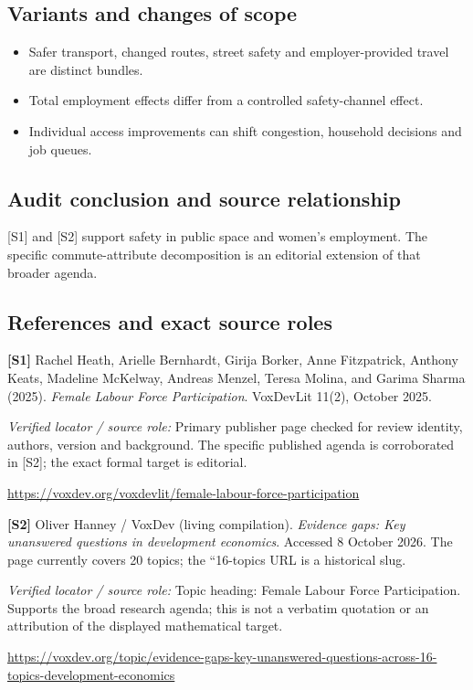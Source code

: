 \documentclass[11pt,a4paper]{article}
\begin{document}
\subsection*{Variants and changes of scope}

\begin{itemize}
\item Safer transport, changed routes, street safety and employer-provided travel are distinct bundles.
\item Total employment effects differ from a controlled safety-channel effect.
\item Individual access improvements can shift congestion, household decisions and job queues.
\end{itemize}

\subsection*{Audit conclusion and source relationship}

[S1] and [S2] support safety in public space and women's employment. The specific commute-attribute decomposition is an editorial extension of that broader agenda.

\subsection*{References and exact source roles}

{\footnotesize\raggedright
\par\noindent\textbf{[S1]} Rachel Heath, Arielle Bernhardt, Girija Borker, Anne Fitzpatrick, Anthony Keats, Madeline McKelway, Andreas Menzel, Teresa Molina, and Garima Sharma (2025). \emph{Female Labour Force Participation}. VoxDevLit 11(2), October 2025.\par \textit{Verified locator / source role:} Primary publisher page checked for review identity, authors, version and background. The specific published agenda is corroborated in [S2]; the exact formal target is editorial.\par \url{https://voxdev.org/voxdevlit/female-labour-force-participation}\par\smallskip
\par\noindent\textbf{[S2]} Oliver Hanney / VoxDev (living compilation). \emph{Evidence gaps: Key unanswered questions in development economics}. Accessed 8 October 2026. The page currently covers 20 topics; the ``16-topics URL is a historical slug.\par \textit{Verified locator / source role:} Topic heading: Female Labour Force Participation. Supports the broad research agenda; this is not a verbatim quotation or an attribution of the displayed mathematical target.\par \url{https://voxdev.org/topic/evidence-gaps-key-unanswered-questions-across-16-topics-development-economics}\par\smallskip
}
\end{document}
